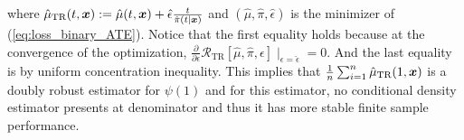 where $\hat{\mu}_{\text{TR}}(t,\boldsymbol{x}):=\hat{\mu}(t,\boldsymbol{x})+\hat{\epsilon}\frac{t}{\hat{\pi}(t\mid\boldsymbol{x})}$ and $(\hat{\mu},\hat{\pi},\hat{\epsilon})$ is the minimizer of (\ref{eq:loss_binary_ATE}). Notice that the first equality holds because at the convergence of the optimization, $\frac{\partial}{\partial\epsilon}\mathcal{R}_{\text{TR}}[\hat{\mu},\hat{\pi},{\epsilon}]\mid_{\epsilon=\hat\epsilon}=0$. And the last equality is by uniform concentration inequality. This implies that $\frac{1}{n}\sum_{i=1}^{n}\hat{\mu}_{\text{TR}}(1,\boldsymbol{x})$ is a doubly robust estimator for $\psi(1)$ and for this estimator, no conditional density estimator presents at denominator and thus it has more stable finite sample performance.


